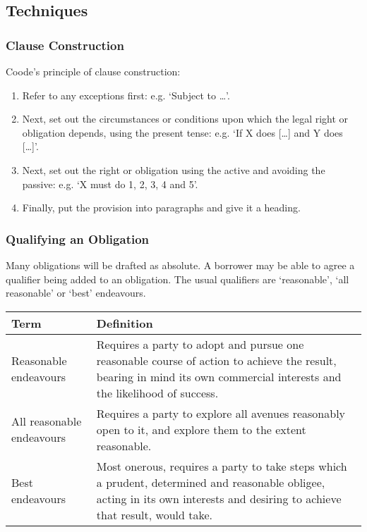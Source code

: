 \documentclass[
]{article}
\providecommand{\tightlist}{%
  \setlength{\itemsep}{0pt}\setlength{\parskip}{0pt}}
\begin{document}
\hypertarget{techniques}{%
\subsection{Techniques}\label{techniques}}

\hypertarget{clause-construction}{%
\subsubsection{Clause Construction}\label{clause-construction}}

Coode's principle of clause construction:

\begin{enumerate}
\tightlist
\item
  Refer to any exceptions first: e.g. `Subject to \ldots'.
\item
  Next, set out the circumstances or conditions upon which the legal
  right or obligation depends, using the present tense: e.g. `If X does
  {[}\ldots{]} and Y does {[}\ldots{]}'.
\item
  Next, set out the right or obligation using the active and avoiding
  the passive: e.g. `X must do 1, 2, 3, 4 and 5'.
\item
  Finally, put the provision into paragraphs and give it a heading.
\end{enumerate}

\hypertarget{qualifying-an-obligation}{%
\subsubsection{Qualifying an
Obligation}\label{qualifying-an-obligation}}

Many obligations will be drafted as absolute. A borrower may be able to
agree a qualifier being added to an obligation. The usual qualifiers are
`reasonable', `all reasonable' or `best' endeavours.

\begin{longtable}[]{@{}ll@{}}
\toprule()
Term & Definition \\
\midrule()
\endhead
Reasonable endeavours & Requires a party to adopt and pursue one
reasonable course of action to achieve the result, bearing in mind its
own commercial interests and the likelihood of success. \\
All reasonable endeavours & Requires a party to explore all avenues
reasonably open to it, and explore them to the extent reasonable. \\
Best endeavours & Most onerous, requires a party to take steps which a
prudent, determined and reasonable obligee, acting in its own interests
and desiring to achieve that result, would take. \\
\bottomrule()
\end{longtable}
\end{document}
